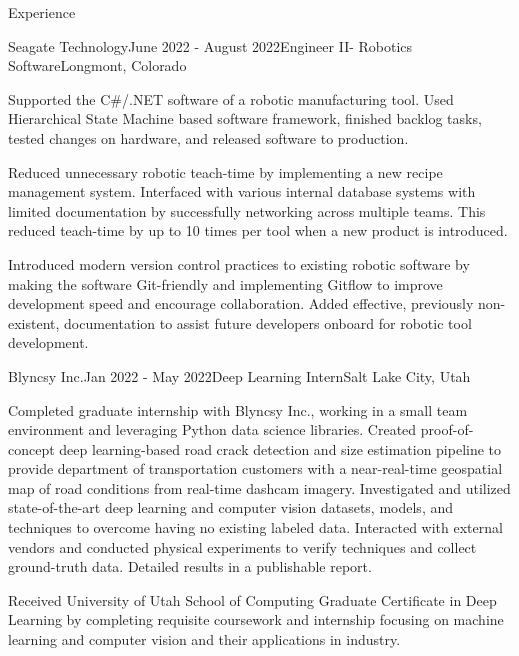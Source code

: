 \documentclass{resume}
\begin{document}
  \begin{rSection}{Experience}

    \begin{rSubsection}{Seagate Technology}{June 2022 - August 2022}{Engineer II- Robotics Software}{Longmont, Colorado}
    \item Supported the C\#/.NET software of a robotic manufacturing tool. 
    Used Hierarchical State Machine based software framework, finished backlog tasks, tested changes on hardware, and released software to production.
    \item Reduced unnecessary robotic teach-time by implementing a new recipe management system. Interfaced with various internal database systems with limited documentation by successfully networking across multiple teams. This reduced teach-time by up to 10 times per tool when a new product is introduced.
    \item Introduced modern version control practices to existing robotic software by making the software Git-friendly and implementing Gitflow to improve development speed and encourage collaboration. Added effective, previously non-existent, documentation to assist future developers onboard for robotic tool development.
    \end{rSubsection}

    \begin{rSubsection}{Blyncsy Inc.}{Jan 2022 - May 2022}{Deep Learning Intern}{Salt Lake City, Utah}
    \item Completed graduate internship with Blyncsy Inc., working in a small team environment and leveraging Python data science libraries. Created proof-of-concept deep learning-based road crack detection and size estimation pipeline to provide department of transportation customers with a near-real-time geospatial map of road conditions from real-time dashcam imagery. Investigated and utilized state-of-the-art deep learning and computer vision datasets, models, and techniques to overcome having no existing labeled data. Interacted with external vendors and conducted physical experiments to verify techniques and collect ground-truth data. Detailed results in a publishable report.
    \item Received University of Utah School of Computing Graduate Certificate in Deep Learning by completing requisite coursework and internship focusing on machine learning and computer vision and their applications in industry.
    \end{rSubsection}
  

\end{rSection}
\end{document}
